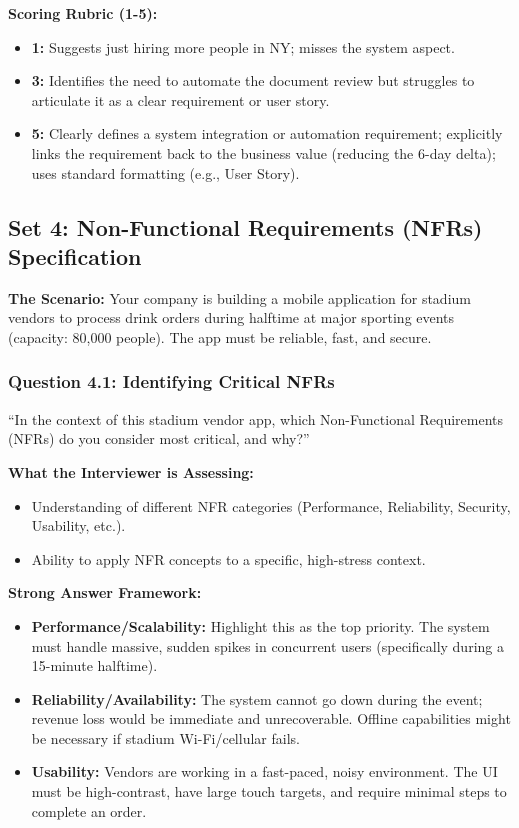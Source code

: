 \documentclass[
  11pt,
  openany,
  oneside]{book}
\providecommand{\tightlist}{%
  \setlength{\itemsep}{0pt}\setlength{\parskip}{0pt}}
\begin{document}
\textbf{Scoring Rubric (1-5):}

\begin{itemize}
\tightlist
\item
  \textbf{1:} Suggests just hiring more people in NY; misses the system
  aspect.
\item
  \textbf{3:} Identifies the need to automate the document review but
  struggles to articulate it as a clear requirement or user story.
\item
  \textbf{5:} Clearly defines a system integration or automation
  requirement; explicitly links the requirement back to the business
  value (reducing the 6-day delta); uses standard formatting (e.g., User
  Story).
\end{itemize}

\bigskip

\subsection{Set 4: Non-Functional Requirements (NFRs)
Specification}\label{set-4-non-functional-requirements-nfrs-specification}

\textbf{The Scenario:} Your company is building a mobile application for
stadium vendors to process drink orders during halftime at major
sporting events (capacity: 80,000 people). The app must be reliable,
fast, and secure.

\subsubsection{Question 4.1: Identifying Critical
NFRs}\label{question-4.1-identifying-critical-nfrs}

``In the context of this stadium vendor app, which Non-Functional
Requirements (NFRs) do you consider most critical, and why?''

\textbf{What the Interviewer is Assessing:}

\begin{itemize}
\tightlist
\item
  Understanding of different NFR categories (Performance, Reliability,
  Security, Usability, etc.).
\item
  Ability to apply NFR concepts to a specific, high-stress context.
\end{itemize}

\textbf{Strong Answer Framework:}

\begin{itemize}
\tightlist
\item
  \textbf{Performance/Scalability:} Highlight this as the top priority.
  The system must handle massive, sudden spikes in concurrent users
  (specifically during a 15-minute halftime).
\item
  \textbf{Reliability/Availability:} The system cannot go down during
  the event; revenue loss would be immediate and unrecoverable. Offline
  capabilities might be necessary if stadium Wi-Fi/cellular fails.
\item
  \textbf{Usability:} Vendors are working in a fast-paced, noisy
  environment. The UI must be high-contrast, have large touch targets,
  and require minimal steps to complete an order.
\end{itemize}
\end{document}
